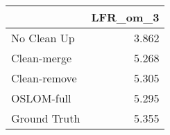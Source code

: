 \begin{tabular}{lr}
\toprule
{} & LFR_om_3 \\
\midrule
No Clean Up  &    3.862 \\
Clean-merge  &    5.268 \\
Clean-remove &    5.305 \\
OSLOM-full   &    5.295 \\
Ground Truth &    5.355 \\
\bottomrule
\end{tabular}
